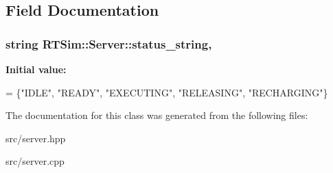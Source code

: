 \subsection{Field Documentation}
\subsubsection[{\texorpdfstring{status\+\_\+string}{status_string}}]{\setlength{\rightskip}{0pt plus 5cm}string R\+T\+Sim\+::\+Server\+::status\+\_\+string\hspace{0.3cm}{\ttfamily [static]}, {\ttfamily [protected]}}\hypertarget{classRTSim_1_1Server_a8852e32d572cf1a98de914e5e9583382}{}\label{classRTSim_1_1Server_a8852e32d572cf1a98de914e5e9583382}
{\bfseries Initial value\+:}
\begin{DoxyCode}
= \{\textcolor{stringliteral}{"IDLE"}, 
                                      \textcolor{stringliteral}{"READY"}, 
                                      \textcolor{stringliteral}{"EXECUTING"},
                                      \textcolor{stringliteral}{"RELEASING"}, 
                                      \textcolor{stringliteral}{"RECHARGING"}\}
\end{DoxyCode}


The documentation for this class was generated from the following files\+:\begin{DoxyCompactItemize}
\item 
src/server.\+hpp\item 
src/server.\+cpp\end{DoxyCompactItemize}
